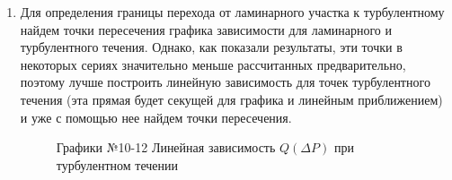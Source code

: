 \documentclass[a4paper]{article}
\begin{document}
\begin{enumerate}
\item Для определения границы перехода от ламинарного участка к турбулентному найдем точки пересечения графика зависимости для ламинарного и турбулентного течения. Однако, как показали результаты, эти точки в некоторых сериях значительно меньше рассчитанных предварительно, поэтому лучше построить линейную зависимость для точек турбулентного течения (эта прямая будет секущей для графика и линейным приближением) и уже с помощью нее найдем точки пересечения.
\begin{figure}[h!]
\caption[]{\label{} Графики №10-12 Линейная зависимость $Q(\Delta P)$ при турбулентном течении}
\end{figure}
\clearpage
\begin{figure}[h!]

\end{figure}
\end{enumerate}
\end{document}

